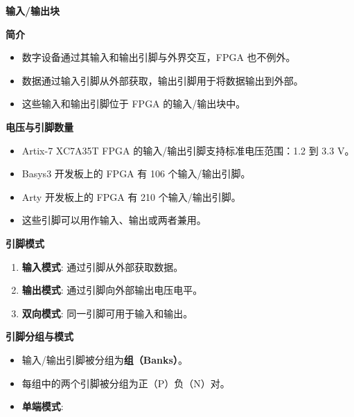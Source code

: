 \begin{frame}[allowframebreaks]{\textbf{输入/输出块}}
\begin{block}{\textbf{简介}}
\label{ux7b80ux4ecb}
\begin{itemize}
\tightlist
\item
    数字设备通过其输入和输出引脚与外界交互，FPGA 也不例外。
\item
    数据通过输入引脚从外部获取，输出引脚用于将数据输出到外部。
\item
    这些输入和输出引脚位于 FPGA 的输入/输出块中。
\end{itemize}
\end{block}

\begin{block}{\textbf{电压与引脚数量}}
\label{ux7535ux538bux4e0eux5f15ux811aux6570ux91cf}
\begin{itemize}
\tightlist
\item
    Artix-7 XC7A35T FPGA 的输入/输出引脚支持标准电压范围：1.2 到 3.3 V。
\item
    Basys3 开发板上的 FPGA 有 106 个输入/输出引脚。
\item
    Arty 开发板上的 FPGA 有 210 个输入/输出引脚。
\item
    这些引脚可以用作输入、输出或两者兼用。
\end{itemize}
\end{block}

\begin{block}{\textbf{引脚模式}}
\label{ux5f15ux811aux6a21ux5f0f}
\begin{enumerate}
\tightlist
\item
    \textbf{输入模式}: 通过引脚从外部获取数据。
\item
    \textbf{输出模式}: 通过引脚向外部输出电压电平。
\item
    \textbf{双向模式}: 同一引脚可用于输入和输出。
\end{enumerate}
\end{block}

\begin{block}{\textbf{引脚分组与模式}}
\label{ux5f15ux811aux5206ux7ec4ux4e0eux6a21ux5f0f}
\begin{itemize}
\tightlist
\item
    输入/输出引脚被分组为\textbf{组（Banks）}。
\item
    每组中的两个引脚被分组为正（P）负（N）对。
\item
    \textbf{单端模式}:


\end{itemize}
\end{block}
\end{frame}
